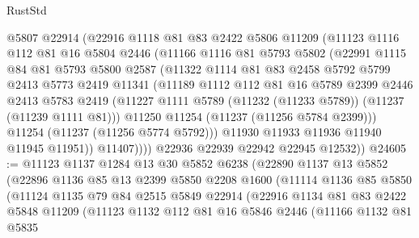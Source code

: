 \begin{lexlean}{RustStd}
\begin{coremodule}
            @5807
            @22914
            (@22916
              @1118
              @81
              @83
              @2422
              @5806
              @11209
              (@11123
                @1116
                @112
                @81
                @16
                @5804
                @2446
                (@11166
                  @1116
                  @81
                  @5793
                  @5802
                  (@22991
                    @1115
                    @84
                    @81
                    @5793
                    @5800
                    @2587
                    (@11322
                      @1114
                      @81
                      @83
                      @2458
                      @5792
                      @5799
                      @2413
                      @5773
                      @2419
                      @11341
                      (@11189
                        @1112
                        @112
                        @81
                        @16
                        @5789
                        @2399
                        @2446
                        @2413
                        @5783
                        @2419
                        (@11227 @1111 @5789 (@11232 (@11233 @5789)) (@11237 (@11239 @1111 @81)))
                        @11250
                        @11254
                        (@11237 (@11256 @5784 @2399)))
                      @11254
                      (@11237 (@11256 @5774 @5792)))
                    @11930
                    @11933
                    @11936
                    @11940
                    @11945
                    @11951))
                @11407))))
        @22936
        @22939
        @22942
        @22945
        @12532))
@24605 := @11123
    @1137
    @1284
    @13
    @30
    @5852
    @6238
    (@22890
      @1137
      @13
      @5852
      (@22896
        @1136
        @85
        @13
        @2399
        @5850
        @2208
        @1600
        (@11114
          @1136
          @85
          @5850
          (@11124
            @1135
            @79
            @84
            @2515
            @5849
            @22914
            (@22916
              @1134
              @81
              @83
              @2422
              @5848
              @11209
              (@11123
                @1132
                @112
                @81
                @16
                @5846
                @2446
                (@11166
                  @1132
                  @81
                  @5835

\end{coremodule}
\end{lexlean}
